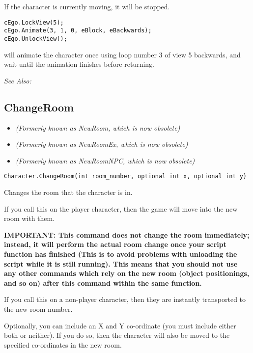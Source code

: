 If the character is currently moving, it will be stopped.

\begin{verbatim}
cEgo.LockView(5);
cEgo.Animate(3, 1, 0, eBlock, eBackwards);
cEgo.UnlockView();
\end{verbatim}
will animate the character once using loop number 3 of view 5 backwards, and
wait until the animation finishes before returning.

\it{See Also:} 



\subsection{ChangeRoom}\label{Character.ChangeRoom}%

\begin{itemize}
\item \it{(Formerly known as NewRoom, which is now obsolete)}
\item \it{(Formerly known as NewRoomEx, which is now obsolete)}
\item \it{(Formerly known as NewRoomNPC, which is now obsolete)}
\end{itemize}

\begin{verbatim}
Character.ChangeRoom(int room_number, optional int x, optional int y)
\end{verbatim}

Changes the room that the character is in.

If you call this on the player character, then the game will move into the new
room with them.

\bf{IMPORTANT:} This command does not change the room immediately; instead, it
will perform the actual room change once your script function has finished
(This is to avoid problems with unloading the script while it is still
running). This means that you should not use any other commands which rely
on the new room (object positionings, and so on) after this command within
the same function.

If you call this on a non-player character, then they are instantly transported
to the new room number.

Optionally, you can include an X and Y co-ordinate (you must include either both
or neither). If you do so, then the character will also be moved to the specified
co-ordinates in the new room.

